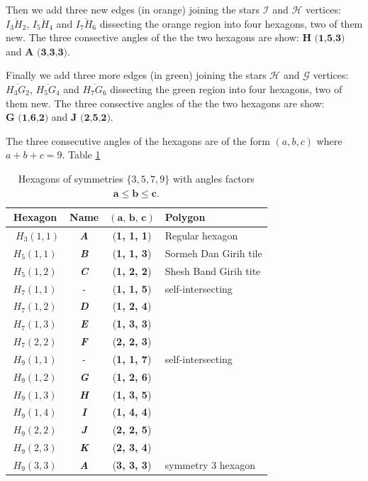 \documentclass[11pt]{article}
\def\mathbi#1{\textbf{\em #1}}
\begin{document}
Then we add three new edges (in orange) joining the stars $\mathcal{I}$ and $\mathcal{H}$ vertices: $\overline{I_3H_2}$, $\overline{I_5H_4}$ and $\overline{I_7H_6}$ dissecting the orange region into four hexagons, two of them new. The three consective angles of the the two hexagons are show: $\textbf{H (1,5,3)}$ and $\textbf{A (3,3,3)}$.

Finally we add three more edges (in green) joining the stars $\mathcal{H}$ and $\mathcal{G}$ vertices:
$\overline{H_3G_2}$, $\overline{H_5G_4}$ and $\overline{H_7G_6}$ dissecting the green region into four hexagons, two of them new. The three consective angles of the the two hexagons are show: $\textbf{G (1,6,2)}$ and $\textbf{J (2,5,2)}$.




The three consecutive angles of the hexagons are of the form $(a,b,c)$ where $a+b+c = 9$. Table \ref{tbl:hexagons-angles}

\begin{table}[H]
\begin{center}
\begin{tabular}{| c | c | c | l | }
\hline
Hexagon & Name & $(\textbf{a, b, c})$ & Polygon \\ \hline\
$H_3(1,1)$ & \mathbi{A} & (\textbf{1, 1, 1}) & Regular hexagon \\[0.5ex]
\hline
$H_5(1,1)$ & \mathbi{B} & (\textbf{1, 1, 3}) & Sormeh Dan Girih tile\\[0.5ex]
$H_5(1,2)$ & \mathbi{C} & (\textbf{1, 2, 2}) & Shesh Band Girih tite\\[0.5ex]
\hline
$H_7(1,1)$ & -          & (\textbf{1, 1, 5}) & self-intersecting \\[0.5ex]
$H_7(1,2)$ & \mathbi{D} & (\textbf{1, 2, 4}) & \\[0.5ex]
$H_7(1,3)$ & \mathbi{E} & (\textbf{1, 3, 3}) & \\[0.5ex]
$H_7(2,2)$ & \mathbi{F} & (\textbf{2, 2, 3}) & \\[0.5ex]
\hline
$H_9(1,1)$ & -          & (\textbf{1, 1, 7}) & self-intersecting \\[0.5ex]
$H_9(1,2)$ & \mathbi{G} & (\textbf{1, 2, 6}) & \\[0.5ex]
$H_9(1,3)$ & \mathbi{H} & (\textbf{1, 3, 5}) & \\[0.5ex]
$H_9(1,4)$ & \mathbi{I} & (\textbf{1, 4, 4}) & \\[0.5ex]
$H_9(2,2)$ & \mathbi{J} & (\textbf{2, 2, 5}) & \\[0.5ex]
$H_9(2,3)$ & \mathbi{K} & (\textbf{2, 3, 4}) & \\[0.5ex]
$H_9(3,3)$ & \mathbi{A} & (\textbf{3, 3, 3}) & symmetry 3 hexagon\\[1.1ex]
\hline
\end{tabular}
\caption{Hexagons of symmetries $\{3,5,7,9\}$ with angles factors $\mathbf{a} \leq \mathbf{b} \leq \mathbf{c}$.} 
\label{tbl:hexagons-angles}
\end{center}
\end{table}
\end{document}
